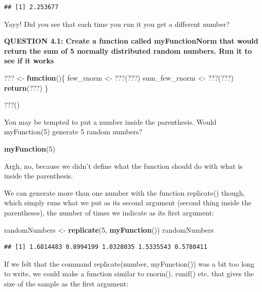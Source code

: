 \documentclass[]{book}
\newenvironment{Shaded}{\begin{snugshade}}{\end{snugshade}}
\newcommand{\ControlFlowTok}[1]{\textcolor[rgb]{0.13,0.29,0.53}{\textbf{#1}}}
\newcommand{\DecValTok}[1]{\textcolor[rgb]{0.00,0.00,0.81}{#1}}
\newcommand{\KeywordTok}[1]{\textcolor[rgb]{0.13,0.29,0.53}{\textbf{#1}}}
\newcommand{\NormalTok}[1]{#1}
\newcommand{\StringTok}[1]{\textcolor[rgb]{0.31,0.60,0.02}{#1}}
\begin{document}
\begin{verbatim}
## [1] 2.253677
\end{verbatim}

Yayy! Did you see that each time you run it you get a different number?

\textbf{QUESTION 4.1: Create a function called myFunctionNorm that would return the sum of 5 normally distributed random numbers. Run it to see if it works}

\begin{Shaded}
\begin{Highlighting}[]
\NormalTok{??? <-}\StringTok{ }\ControlFlowTok{function}\NormalTok{()\{}
\NormalTok{  few_rnorm <-}\StringTok{ }\NormalTok{???(???)}
\NormalTok{  sum_few_rnorm <-}\StringTok{ }\NormalTok{???(???)}
  \KeywordTok{return}\NormalTok{(???)}
\NormalTok{\}}

\NormalTok{???()}
\end{Highlighting}
\end{Shaded}

You may be tempted to put a number inside the parenthesis. Would myFunction(5) generate 5 random numbers?

\begin{Shaded}
\begin{Highlighting}[]
\KeywordTok{myFunction}\NormalTok{(}\DecValTok{5}\NormalTok{)}
\end{Highlighting}
\end{Shaded}

Argh, no, because we didn't define what the function should do with what is inside the parenthesis.

We can generate more than one number with the function replicate() though, which simply runs what we put as its second argument (second thing inside the parentheses), the number of times we indicate as its first argument:

\begin{Shaded}
\begin{Highlighting}[]
\NormalTok{randomNumbers <-}\StringTok{ }\KeywordTok{replicate}\NormalTok{(}\DecValTok{5}\NormalTok{, }\KeywordTok{myFunction}\NormalTok{())}
\NormalTok{randomNumbers}
\end{Highlighting}
\end{Shaded}

\begin{verbatim}
## [1] 1.6814483 0.8994199 1.0328035 1.5335543 0.5780411
\end{verbatim}

If we felt that the command replicate(number, myFunction()) was a bit too long to write, we could make a function similar to rnorm(), runif() etc. that gives the size of the sample as the first argument:
\end{document}
